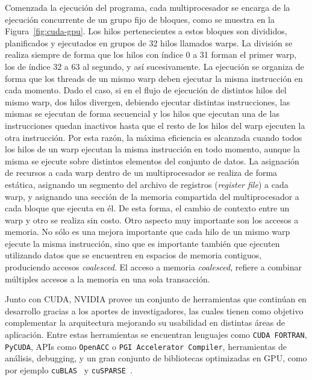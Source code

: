 Comenzada la ejecución del programa, cada multiprocesador se encarga de la ejecución concurrente de un grupo fijo de bloques, como se muestra en la Figura~\ref{fig:cuda-gpu}. Los hilos pertenecientes a estos bloques son divididos, planificados y ejecutados en grupos de 32 hilos llamados warps. La división se realiza siempre de forma que los hilos con índice 0 a 31 forman el primer warp, los de índice 32 a 63 al segundo, y así sucesivamente. La ejecución se organiza de forma que los threads de un mismo warp deben ejecutar la misma instrucción en cada momento. Dado el caso, si en el flujo de ejecución de distintos hilos del mismo warp, dos hilos divergen, debiendo ejecutar distintas instrucciones, las mismas se ejecutan de forma secuencial y los hilos que ejecutan una de las instrucciones quedan inactivos hasta que el resto de los hilos del warp ejecuten la otra instrucción. Por esta razón, la máxima eficiencia es alcanzada cuando todos los hilos de un warp ejecutan la misma instrucción en todo momento, aunque la misma se ejecute sobre distintos elementos del conjunto de datos. La asignación de recursos a cada warp dentro de un multiprocesador se realiza de forma estática, asignando un segmento del archivo de registros (\textit{register file}) a cada warp, y asignando una sección de la memoria compartida del multiprocesador a cada bloque que ejecuta en él. De esta forma, el cambio de contexto entre un warp y otro se realiza sin costo. 
Otro aspecto muy importante son los accesos a memoria. No sólo es una mejora importante que cada hilo de un mismo warp ejecute la misma instrucción, sino que es importante también que ejecuten utilizando datos que se encuentren en espacios de memoria contiguos, produciendo accesos \textit{coalesced}. El acceso a memoria \textit{coalesced}, refiere a combinar múltiples accesos a la memoria en una sola transacción. %


Junto con CUDA, NVIDIA provee un conjunto de herramientas que continúan en desarrollo gracias a los aportes de investigadores, las cuales tienen como objetivo complementar la arquitectura mejorando su usabilidad en distintas áreas de aplicación. Entre estas herramientas se encuentran lenguajes como \texttt{CUDA FORTRAN}, \texttt{PyCUDA}, APIs como \texttt{OpenACC} o \texttt{PGI Accelerator Compiler}, herramientas de análisis, debugging, y un gran conjunto de bibliotecas optimizadas en GPU, como por ejemplo \texttt{cuBLAS}~\cite{cublas} y \texttt{cuSPARSE}~\cite{cusparse}.


